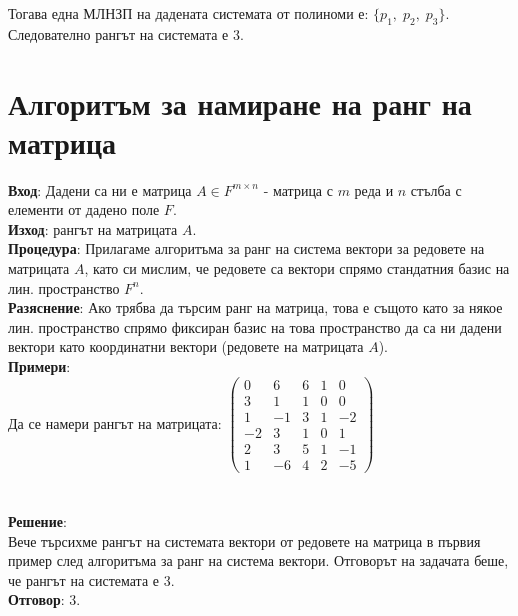\documentclass[12pt]{article}
\begin{document}
Тогава една МЛНЗП на дадената системата от полиноми е: $\{p_1, \; p_2, \; p_3\}$. \\

Следователно рангът на системата е $3$.

\section*{Алгоритъм за намиране на ранг на матрица}

\textbf{Вход}: Дадени са ни е матрица $A \in F^{m \times n}$ - матрица с $m$ реда и $n$ стълба с елементи от дадено поле $F$. \\

\textbf{Изход}: рангът на матрицата $A$. \\

\textbf{Процедура}: Прилагаме алгоритъма за ранг на система вектори за редовете на матрицата $A$,
като си мислим, че редовете са вектори спрямо стандатния базис на лин. пространство $F^n$. \\

\textbf{Разяснение}: Ако трябва да търсим ранг на матрица, това е същото като за някое лин. пространство
спрямо фиксиран базис на това пространство да са ни дадени вектори като координатни вектори (редовете на матрицата $A$). \\

\textbf{Примери}: \\

Да се намери рангът на матрицата: $\begin{pmatrix}
    0 &  6 & 6 & 1 &  0 \\
    3 &  1 & 1 & 0 &  0 \\
    1 & -1 & 3 & 1 & -2 \\
   -2 &  3 & 1 & 0 &  1 \\
    2 &  3 & 5 & 1 & -1 \\
    1 & -6 & 4 & 2 & -5
\end{pmatrix}$ \\\\\\

\textbf{Решение}: \\

Вече търсихме рангът на системата вектори от редовете на матрица в първия пример след алгоритъма за ранг на система вектори.
Отговорът на задачата беше, че рангът на системата е $3$. \\

\textbf{Отговор}: $3$.
\end{document}

